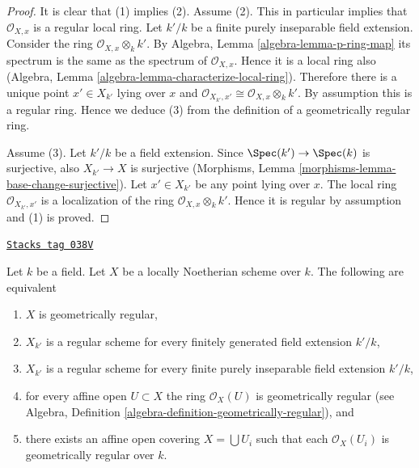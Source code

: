 \begin{proof}
It is clear that (1) implies (2).
Assume (2). This in particular implies that $\mathcal{O}_{X, x}$
is a regular local ring. Let $k'/k$ be a finite purely inseparable
field extension. Consider the ring $\mathcal{O}_{X, x} \otimes_k k'$.
By Algebra, Lemma \ref{algebra-lemma-p-ring-map}
its spectrum is the same as the spectrum of $\mathcal{O}_{X, x}$.
Hence it is a local ring also
(Algebra, Lemma \ref{algebra-lemma-characterize-local-ring}).
Therefore there is a unique point $x' \in X_{k'}$ lying over $x$
and $\mathcal{O}_{X_{k'}, x'} \cong \mathcal{O}_{X, x} \otimes_k k'$.
By assumption this is a regular ring. Hence we deduce (3)
from the definition of a geometrically regular ring.

\medskip\noindent
Assume (3). Let $k'/k$ be a field extension. Since
$\Spec(k') \to \Spec(k)$ is surjective, also
$X_{k'} \to X$ is surjective
(Morphisms, Lemma \ref{morphisms-lemma-base-change-surjective}).
Let $x' \in X_{k'}$ be any point lying over $x$.
The local ring $\mathcal{O}_{X_{k'}, x'}$
is a localization of the ring $\mathcal{O}_{X, x} \otimes_k k'$.
Hence it is regular by assumption and (1) is proved.
\end{proof}

\begin{lemma}
\label{varieties-lemma-geometrically-regular}
\href{https://stacks.math.columbia.edu/tag/038V}{\texttt{Stacks tag 038V}}

Let $k$ be a field.
Let $X$ be a locally Noetherian scheme over $k$.
The following are equivalent
\begin{enumerate}
\item $X$ is geometrically regular,
\item $X_{k'}$ is a regular scheme for every finitely generated field
extension $k'/k$,
\item $X_{k'}$ is a regular scheme for every finite purely inseparable
field extension $k'/k$,
\item for every affine open $U \subset X$ the ring $\mathcal{O}_X(U)$
is geometrically regular (see
Algebra, Definition \ref{algebra-definition-geometrically-regular}), and
\item there exists an affine open covering $X = \bigcup U_i$ such that
each $\mathcal{O}_X(U_i)$ is geometrically regular over $k$.
\end{enumerate}
\end{lemma}

